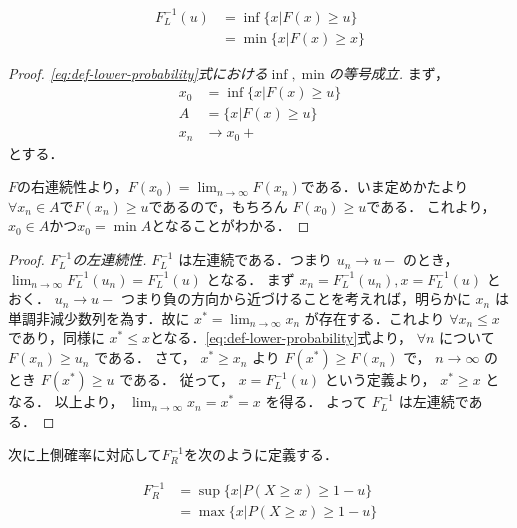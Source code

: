\documentclass[12pt,a4j,draft]{jarticle}
\numberwithin{equation}{section}
\theoremstyle{break}
\newcommand{\inv}[1]{#1^{-1}}
\begin{document}
\begin{equation}
\begin{split}
    \inv{F_L}(u) &= \inf \{ x | F(x) \geq u \} \\
    &= \min \{ x|F(x) \geq x \}
    \label{eq:def-lower-probability}
\end{split}
\end{equation}

\begin{proof}[Proof. \eqref{eq:def-lower-probability}式における$\inf, \min$の等号成立]
    まず，
    \begin{align}
        x_0 &= \inf \{ x | F(x) \geq u \} \\
        A &= \{ x | F(x) \geq u \}\\
        x_n &\rightarrow x_0+
    \end{align}
    とする．

    $F$の右連続性より，$F(x_0) = \displaystyle \lim_{n \rightarrow \infty} F(x_n)$である．いま定めかたより$\forall x_n \in A$で$F(x_n) \geq u$であるので，もちろん $F(x_0) \geq u$である．
    これより， $x_0 \in A$かつ$x_0 = \min A$となることがわかる．
\end{proof}  

\begin{proof}[Proof. $\inv{F_L}$の左連続性]
    $\inv{F_L}$ は左連続である．つまり $u_n \rightarrow u-$ のとき， $\displaystyle \lim_{n \rightarrow \infty} \inv{F_L} (u_n) = \inv{F_L}(u)$ となる．
    まず $x_n = \inv{F_L}(u_n), x = \inv{F_L}(u)$ とおく． $u_n \rightarrow u-$ つまり負の方向から近づけることを考えれば，明らかに $x_n$ は単調非減少数列を為す．故に $x^\ast = \displaystyle \lim_{ n \rightarrow \infty} x_n$ が存在する．これより $\forall x_n \leq x$ であり，同様に $x^\ast \leq x$となる．\eqref{eq:def-lower-probability}式より， $\forall n$ について $F(x_n) \geq u_n$ である． 
    さて， $x^\ast \geq x_n$ より $F(x^\ast) \geq F(x_n)$ で， $n \rightarrow \infty$ のとき $F(x^\ast) \geq u$ である． 従って， $x = \inv{F_L}(u)$ という定義より， $x^\ast \geq x$ となる．
    以上より， $\displaystyle \lim_{n \rightarrow \infty} x_n = x^\ast = x$ を得る． よって $\inv{F_L}$ は左連続である．
\end{proof}

次に上側確率に対応して$\inv{F_R}$を次のように定義する．

\begin{equation}
    \begin{split}
        \inv{F_R} &= \sup \{ x | P(X \geq x) \geq 1-u \} \\
        &= \max \{ x | P(X \geq x) \geq 1-u \}
    \end{split}
    \label{eq:def-upper-probability}
\end{equation}
\end{document}
